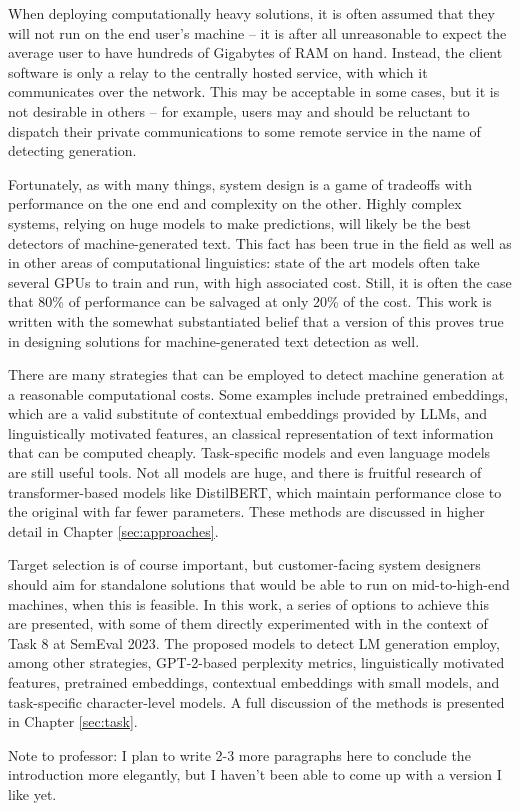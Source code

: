 When deploying computationally heavy solutions, it is often assumed that they will not run on the end user's machine -- it is after all unreasonable to expect the average user to have hundreds of Gigabytes of RAM on hand.
Instead, the client software is only a relay to the centrally hosted service, with which it communicates over the network.
This may be acceptable in some cases, but it is not desirable in others -- for example, users may and should be reluctant to dispatch their private communications to some remote service in the name of detecting generation.

Fortunately, as with many things, system design is a game of tradeoffs with performance on the one end and complexity on the other.
Highly complex systems, relying on huge models to make predictions, will likely be the best detectors of machine-generated text.
This fact has been true in the field as well as in other areas of computational linguistics: state of the art models often take several GPUs to train and run, with high associated cost.
Still, it is often the case that 80\% of performance can be salvaged at only 20\% of the cost.
This work is written with the somewhat substantiated belief that a version of this proves true in designing solutions for machine-generated text detection as well.

There are many strategies that can be employed to detect machine generation at a reasonable computational costs.
Some examples include pretrained embeddings, which are a valid substitute of contextual embeddings provided by LLMs, and linguistically motivated features, an classical representation of text information that can be computed cheaply.
Task-specific models and even language models are still useful tools.
Not all models are huge, and there is fruitful research of transformer-based models like DistilBERT, which maintain performance close to the original with far fewer parameters.
These methods are discussed in higher detail in Chapter \ref{sec:approaches}.

Target selection is of course important, but customer-facing system designers should aim for standalone solutions that would be able to run on mid-to-high-end machines, when this is feasible.
In this work, a series of options to achieve this are presented, with some of them directly experimented with in the context of Task 8 at SemEval 2023.
The proposed models to detect LM generation employ, among other strategies, GPT-2-based perplexity metrics, linguistically motivated features, pretrained embeddings, contextual embeddings with small models, and task-specific character-level models.
A full discussion of the methods is presented in Chapter \ref{sec:task}.

Note to professor: I plan to write 2-3 more paragraphs here to conclude the introduction more elegantly, but I haven't been able to come up with a version I like yet.
